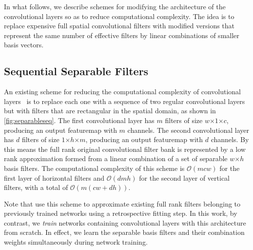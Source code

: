 \documentclass[thesis]{subfiles}
\begin{document}
    In what follows, we describe schemes for modifying the architecture of the convolutional layers so as to reduce computational complexity. The idea is to replace expensive full spatial convolutional filters with modified versions that represent the same number of effective filters by linear combinations of smaller basis vectors. 
    
    \subsection{Sequential Separable Filters}\label{seqsep}
    An existing scheme for reducing the computational complexity of convolutional layers~\citep{journals/corr/JaderbergVZ14} is to replace each one with a sequence of two regular convolutional layers but with filters that are rectangular in the spatial domain, as shown in \cref{fig:separableseq}. The first convolutional layer has $m$ filters of size $w$$\times$$1$$\times$$c$, producing an output \gls{featuremap} with $m$ channels. The second convolutional layer has $d$ filters of size $1$$\times$$h$$\times$$m$, producing an output \gls{featuremap} with $d$ channels. By this means the full rank original convolutional filter bank is represented by a low rank approximation formed from a linear combination of a set of separable $w$$\times$$h$ basis filters.  The computational complexity of this scheme is $\mathcal{O}(m c w)$ for the first layer of horizontal filters and $\mathcal{O}(d m h)$ for the second layer of vertical filters, with a total of $\mathcal{O}(m(c w + d h))$.
    
    Note that \citet{journals/corr/JaderbergVZ14} use this scheme to approximate existing full rank filters belonging to previously trained networks using a retrospective fitting step. In this work, by contrast,  we {\em train} networks containing convolutional layers with this architecture from scratch. In effect, we learn the separable basis filters and their combination weights simultaneously during network training.
    
    
\end{document}
